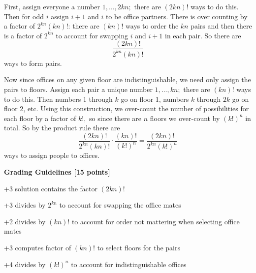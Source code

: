 \documentclass[12pt]{exam}
\begin{document}
\begin{solution}
First, assign everyone a number $1,\dots, 2kn;$ there are $(2kn)!$ ways to do this. Then for odd $i$ assign $i+1$ and $i$ to be office partners. There is over counting by a factor of $2^{kn} (kn)!$: there are $(kn)!$ ways to order the $kn$ pairs and then there is a factor of $2^{kn}$ to account for swapping $i$ and $i+1$ in each pair. So there are $$\frac{(2kn)!}{2^{kn}(kn)!}$$ ways to form pairs.

Now since offices on any given floor are indistinguishable, we need only assign the pairs to floors. Assign each pair a unique number $1,\dots, kn;$ there are $(kn)!$ ways to do this. Then numbers 1 through $k$ go on floor 1, numbers $k$ through $2k$ go on floor 2, etc. Using this construction, we over-count the number of possibilities for each floor by a factor of $k!,$ so since there are $n$ floors we over-count by $(k!)^n$ in total. So by the product rule there are
$$\frac{(2kn)!}{2^{kn}(kn)!}\cdot\frac{(kn)!}{(k!)^n} = \frac{(2kn)!}{2^{kn}(k!)^n}$$
ways to assign people to offices.

\textbf{Grading Guidelines [15 points]}
\begin{gwguidelines}
    \item +3 solution contains the factor $(2kn)!$
    \item +3 divides by $2^{kn}$ to account for swapping the office mates
    \item +2 divides by $(kn)!$ to account for order not mattering when selecting office mates
    \item +3 computes factor of $(kn)!$ to select floors for the pairs
    \item +4 divides by $(k!)^n$ to account for indistinguishable offices
\end{gwguidelines}
\end{solution}
\end{document}
